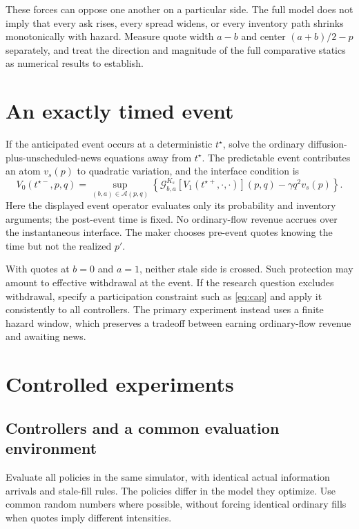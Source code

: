 \documentclass[11pt]{article}
\newcommand{\1}{\mathbf 1}
\newcommand{\G}{\mathcal G}
\newcommand{\A}{\mathcal A}
\begin{document}
These forces can oppose one another on a particular side. The full model does
not imply that every ask rises, every spread widens, or every inventory path
shrinks monotonically with hazard. Measure quote width $a-b$ and center
$(a+b)/2-p$ separately, and treat the direction and magnitude of the full
comparative statics as numerical results to establish.

\section{An exactly timed event}
If the anticipated event occurs at a deterministic $t^\star$, solve the
ordinary diffusion-plus-unscheduled-news equations away from $t^\star$.
The predictable event contributes an atom $v_s(p)$ to quadratic variation,
and the interface condition is
\begin{equation}
 V_0(t^{\star-},p,q)=\sup_{(b,a)\in\A(p,q)}
 \left\{\G^{K_s}_{b,a}[V_1(t^{\star+},\cdot,\cdot)](p,q)
             -\gamma q^2v_s(p)\right\}.
 \label{eq:interface}
\end{equation}
Here the displayed event operator evaluates only its probability and inventory
arguments; the post-event time is fixed. No ordinary-flow revenue accrues over
the instantaneous interface. The maker chooses pre-event quotes knowing the
time but not the realized $p'$.

With quotes at $b=0$ and $a=1$, neither stale side is crossed. Such protection
may amount to effective withdrawal at the event. If the research question
excludes withdrawal, specify a participation constraint such as \eqref{eq:cap}
and apply it consistently to all controllers. The primary experiment instead
uses a finite hazard window, which preserves a tradeoff between earning
ordinary-flow revenue and awaiting news.

\section{Controlled experiments}
\subsection{Controllers and a common evaluation environment}
Evaluate all policies in the same simulator, with identical actual information
arrivals and stale-fill rules. The policies differ in the model they optimize.
Use common random numbers where possible, without forcing identical ordinary
fills when quotes imply different intensities.
\end{document}
